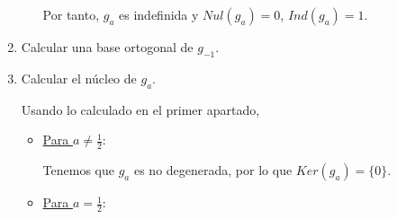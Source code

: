 \documentclass[12pt]{article}
\begin{document}
\begin{ejercicio}
\begin{enumerate}
\begin{itemize}
            Por tanto, $g_a$ es indefinida y $Nul(g_a)=0$, $Ind(g_a)=1$.
        \end{itemize}


        \item Calcular una base ortogonal de $g_{-1}$.

        \begin{comment}
        Tenemos que:
        \begin{equation*}
            G_{-1} = M(g_{-1}, \cc{B}_u) = \left(\begin{array}{ccc}
                -1 & 0 & 2 \\
                0 & 1 & 0 \\
                2 & 0 & -1
            \end{array}\right)
        \end{equation*}

        Calculamos su polinomio característico:
        \begin{equation*}
            P_{G_{-1}}(\lambda)
        \end{equation*}
        \end{comment}
        
        \item Calcular el núcleo de $g_a$.

        Usando lo calculado en el primer apartado,
        \begin{itemize}
            \item \underline{Para $a\neq \frac{1}{2}$}:

            Tenemos que $g_a$ es no degenerada, por lo que $Ker(g_a)=\{0\}$.

            \item \underline{Para $a = \frac{1}{2}$}:


\end{itemize}
\end{enumerate}
\end{ejercicio}
\end{document}
